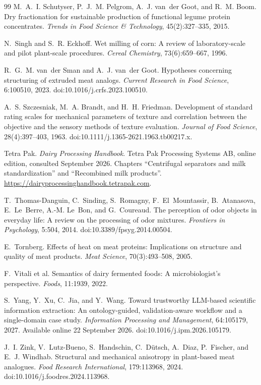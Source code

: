 \documentclass[11pt,openany]{book}
\theoremstyle{definition}
\begin{document}
\begin{thebibliography}{99}
M.~A.~I. Schutyser, P.~J.~M. Pelgrom, A.~J. van~der Goot, and R.~M. Boom.
\newblock Dry fractionation for sustainable production of functional legume protein concentrates.
\newblock \emph{Trends in Food Science \& Technology}, 45(2):327--335, 2015.

N.~Singh and S.~R. Eckhoff.
\newblock Wet milling of corn: A review of laboratory-scale and pilot plant-scale procedures.
\newblock \emph{Cereal Chemistry}, 73(6):659--667, 1996.

R.~G.~M. van~der Sman and A.~J. van~der Goot.
\newblock Hypotheses concerning structuring of extruded meat analogs.
\newblock \emph{Current Research in Food Science}, 6:100510, 2023.
\newblock doi:10.1016/j.crfs.2023.100510.

A.~S. Szczesniak, M.~A. Brandt, and H.~H. Friedman.
\newblock Development of standard rating scales for mechanical parameters of texture and correlation between the objective and the sensory methods of texture evaluation.
\newblock \emph{Journal of Food Science}, 28(4):397--403, 1963.
\newblock doi:10.1111/j.1365-2621.1963.tb00217.x.

Tetra Pak.
\newblock \emph{Dairy Processing Handbook}.
\newblock Tetra Pak Processing Systems AB, online edition, consulted September 2026. Chapters ``Centrifugal separators and milk standardization'' and ``Recombined milk products''. \url{https://dairyprocessinghandbook.tetrapak.com}.

T.~Thomas-Danguin, C.~Sinding, S.~Romagny, F.~El~Mountassir, B.~Atanasova, E.~Le~Berre, A.-M. Le~Bon, and G.~Coureaud.
\newblock The perception of odor objects in everyday life: A review on the processing of odor mixtures.
\newblock \emph{Frontiers in Psychology}, 5:504, 2014.
\newblock doi:10.3389/fpsyg.2014.00504.

E.~Tornberg.
\newblock Effects of heat on meat proteins: Implications on structure and quality of meat products.
\newblock \emph{Meat Science}, 70(3):493--508, 2005.

F.~Vitali et al.
\newblock Semantics of dairy fermented foods: A microbiologist's perspective.
\newblock \emph{Foods}, 11:1939, 2022.

S.~Yang, Y.~Xu, C.~Jia, and Y.~Wang.
\newblock Toward trustworthy LLM-based scientific information extraction: An ontology-guided, validation-aware workflow and a single-domain case study.
\newblock \emph{Information Processing and Management}, 64:105179, 2027.
\newblock Available online 22 September 2026. doi:10.1016/j.ipm.2026.105179.

J.~I. Zink, V.~Lutz-Bueno, S.~Handschin, C.~Dütsch, A.~Diaz, P.~Fischer, and E.~J. Windhab.
\newblock Structural and mechanical anisotropy in plant-based meat analogues.
\newblock \emph{Food Research International}, 179:113968, 2024.
\newblock doi:10.1016/j.foodres.2024.113968.

\end{thebibliography}
\end{document}
